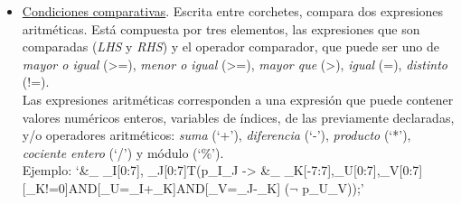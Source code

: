 \documentclass[a4paper]{report}
\begin{document}
\begin{itemize}
\begin{itemize}
\begin{itemize}
\item \underline{Condiciones comparativas}. Escrita entre corchetes, compara dos expresiones aritméticas. Está compuesta por tres elementos, las expresiones que son comparadas (\textit{LHS} y \textit{RHS}) y el operador comparador, que puede ser uno de \textit{mayor o igual} (>=), \textit{menor o igual} (>=), \textit{mayor que} (>), \textit{igual} (=), \textit{distinto} (!=).\\
\newpage
Las expresiones aritméticas corresponden a una expresión que puede contener valores numéricos enteros, variables de índices, de las previamente declaradas, y/o operadores aritméticos: \textit{suma} (`+'), \textit{diferencia} (`-'), \textit{producto} (`*'), \textit{cociente entero} (`/') y módulo (`\%'). \\

Ejemplo: 
\textrm{\small`\&\_ {\_I[0:7], \_J[0:7]}{T}(p\_I\_J -> \&\_ {\_K[-7:7],\_U[0:7],\_V[0:7]} {[\_K!=0]AND[\_U=\_I+\_K]AND[\_V=\_J-\_K]} ($\neg$ p\_U\_V));'} 

\end{itemize}
\end{itemize}



\end{itemize}
\end{document}

